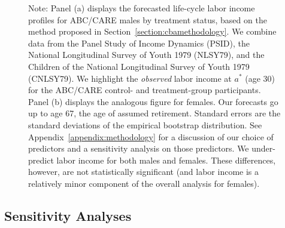 \begin{figure}
Note: Panel (a) displays the forecasted life-cycle labor income profiles for ABC/CARE males by treatment status, based on the method proposed in Section~\ref{section:cbamethodology}. We combine data from the Panel Study of Income Dynamics (PSID), the National Longitudinal Survey of Youth 1979 (NLSY79), and the Children of the National Longitudinal Survey of Youth 1979 (CNLSY79). We highlight the \textit{observed} labor income at $a^*$ (age 30) for the ABC/CARE control- and treatment-group participants. Panel (b) displays the analogous figure for females. Our forecasts go up to age 67, the age of assumed retirement. Standard errors are the standard deviations of the empirical bootstrap distribution. See  Appendix~\ref{appendix:methodology} for a discussion of our choice of predictors and a sensitivity analysis on those predictors. We under-predict labor income for both males and females. These differences, however, are not statistically significant (and labor income is a relatively minor component of the overall analysis for females).
\end{figure}

\subsection{Sensitivity Analyses} \label{section:sens}

